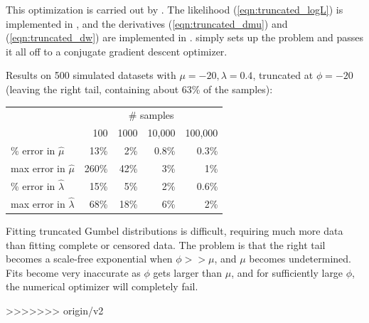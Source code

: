 This optimization is carried out by .
The likelihood (\ref{eqn:truncated_logL}) is implemented in
, and the derivatives (\ref{eqn:truncated_dmu}) and
(\ref{eqn:truncated_dw}) are implemented in .
 simply sets up the problem and passes
it all off to a conjugate gradient descent optimizer.

Results on 500 simulated datasets with $\mu = -20, \lambda = 0.4$,
truncated at $\phi = -20$ (leaving the right tail, containing about
63\% of the samples):

\begin{center}
\begin{tabular}{lrrrr} \hline
                              & \multicolumn{4}{c}{\# samples}\\
                              & 100 & 1000  & 10,000 & 100,000 \\
\% error in $\hat{\mu}$       & 13\%&   2\% &  0.8\% &  0.3\%  \\
max error in $\hat{\mu}$      &260\%&  42\% &    3\% &    1\%  \\
\% error in $\hat{\lambda}$   & 15\%&   5\% &    2\% &  0.6\%  \\
max error in $\hat{\lambda}$  & 68\%&  18\% &    6\% &    2\%  \\ \hline
\end{tabular}
\end{center}

Fitting truncated Gumbel distributions is difficult, requiring much
more data than fitting complete or censored data. The problem is that
the right tail becomes a scale-free exponential when $\phi >> \mu$,
and $\mu$ becomes undetermined. Fits become very inaccurate as $\phi$
gets larger than $\mu$, and for sufficiently large $\phi$, the
numerical optimizer will completely fail.







>>>>>>> origin/v2
